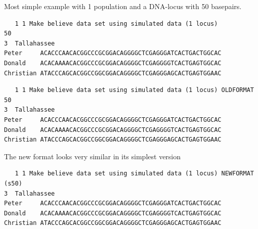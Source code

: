 Most simple example with 1 population and a DNA-locus with 50 basepairs.
\begin{flushleft}
\begin{small}
\begin{tt}
\begin{verbatim}
   1 1 Make believe data set using simulated data (1 locus)
50 
3  Tallahassee 
Peter     ACACCCAACACGGCCCGCGGACAGGGGCTCGAGGGATCACTGACTGGCAC
Donald    ACACAAAACACGGCCCGCGGACAGGGGCTCGAGGGGTCACTGAGTGGCAC
Christian ATACCCAGCACGGCCGGCGGACAGGGGCTCGAGGGAGCACTGAGTGGAAC
\end{verbatim}
\end{tt}
\end{small}
\end{flushleft}
\begin{flushleft}
\begin{small}
\begin{tt}
\begin{verbatim}
   1 1 Make believe data set using simulated data (1 locus) OLDFORMAT
50 
3  Tallahassee 
Peter     ACACCCAACACGGCCCGCGGACAGGGGCTCGAGGGATCACTGACTGGCAC
Donald    ACACAAAACACGGCCCGCGGACAGGGGCTCGAGGGGTCACTGAGTGGCAC
Christian ATACCCAGCACGGCCGGCGGACAGGGGCTCGAGGGAGCACTGAGTGGAAC
\end{verbatim}
\end{tt}
\end{small}
\end{flushleft}
The new format looks very similar in its simplest version
\begin{flushleft}
\begin{small}
\begin{tt}
\begin{verbatim}
   1 1 Make believe data set using simulated data (1 locus) NEWFORMAT
(s50) 
3  Tallahassee 
Peter     ACACCCAACACGGCCCGCGGACAGGGGCTCGAGGGATCACTGACTGGCAC
Donald    ACACAAAACACGGCCCGCGGACAGGGGCTCGAGGGGTCACTGAGTGGCAC
Christian ATACCCAGCACGGCCGGCGGACAGGGGCTCGAGGGAGCACTGAGTGGAAC
\end{verbatim}
\end{tt}
\end{small}
\end{flushleft}

